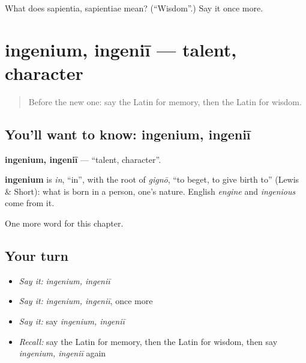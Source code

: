 \begin{tcolorbox}[breakable,colback=teal!4,colframe=teal!35!black,title={Before you move on}]
What does sapientia, sapientiae mean? (\textquotedblleft{}Wisdom\textquotedblright{}.) Say it once more.
\end{tcolorbox}
\section[ingenium, ingeniī]{ingenium, ingeniī — talent, character}

\label{lesson:LA-C206-ingenium}



\begin{quote}
Before the new one: say the Latin for memory, then the Latin for wisdom.
\end{quote}

\subsection*{You'll want to know: ingenium, ingeniī}
\textbf{ingenium, ingeniī} — \textquotedblleft{}talent, character\textquotedblright{}.

\begin{cousinweb}
\textbf{ingenium} is \emph{in}, \textquotedblleft{}in\textquotedblright{}, with the root of \emph{gignō}, \textquotedblleft{}to beget, to give birth to\textquotedblright{} (Lewis \& Short): what is born in a person, one's nature. English \emph{engine} and \emph{ingenious} come from it.
\end{cousinweb}

\begin{grammarlens}[title={What you've built}]
One more word for this chapter.
\end{grammarlens}

\subsection*{Your turn}
\begin{itemize}
\raggedright
  \item \emph{Say it:} \emph{ingenium, ingeniī}
  \item \emph{Say it:} \emph{ingenium, ingeniī}, once more
  \item \emph{Say it:} say \emph{ingenium, ingeniī}
  \item \emph{Recall:} say the Latin for memory, then the Latin for wisdom, then say \emph{ingenium, ingeniī} again
\end{itemize}

